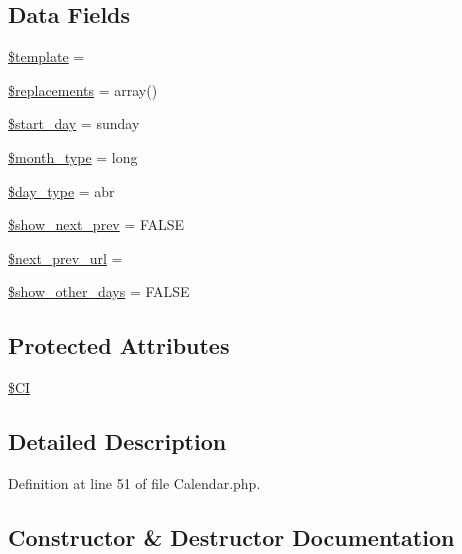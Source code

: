 \subsection*{Data Fields}
\begin{DoxyCompactItemize}
\item 
\mbox{\hyperlink{class_c_i___calendar_aa3e9534005fd516d941f6a5569896e01}{\$template}} = \textquotesingle{}\textquotesingle{}
\item 
\mbox{\hyperlink{class_c_i___calendar_a93cb3f67ace379a71de4fb00bcc7a605}{\$replacements}} = array()
\item 
\mbox{\hyperlink{class_c_i___calendar_ac4e461505bb7cd9a2fdb2bf47560a389}{\$start\+\_\+day}} = \textquotesingle{}sunday\textquotesingle{}
\item 
\mbox{\hyperlink{class_c_i___calendar_ab40961ce0a0e4a7ee10ad389c9566b28}{\$month\+\_\+type}} = \textquotesingle{}long\textquotesingle{}
\item 
\mbox{\hyperlink{class_c_i___calendar_a1e35fdb6b6cc297a6bb256517a8d813d}{\$day\+\_\+type}} = \textquotesingle{}abr\textquotesingle{}
\item 
\mbox{\hyperlink{class_c_i___calendar_aeade2ffe515604c0dffb78d32ca846ae}{\$show\+\_\+next\+\_\+prev}} = F\+A\+L\+SE
\item 
\mbox{\hyperlink{class_c_i___calendar_a3ed0df912e3e67eb17d432c1f54ae2de}{\$next\+\_\+prev\+\_\+url}} = \textquotesingle{}\textquotesingle{}
\item 
\mbox{\hyperlink{class_c_i___calendar_a52c552ab98b51789690522ff7d41ecb7}{\$show\+\_\+other\+\_\+days}} = F\+A\+L\+SE
\end{DoxyCompactItemize}
\subsection*{Protected Attributes}
\begin{DoxyCompactItemize}
\item 
\mbox{\hyperlink{class_c_i___calendar_ae0314d046ddf7fcfaec03222977427d3}{\$\+CI}}
\end{DoxyCompactItemize}


\subsection{Detailed Description}


Definition at line 51 of file Calendar.\+php.



\subsection{Constructor \& Destructor Documentation}
\mbox{\label{class_c_i___calendar_af7f9493844d2d66e924e3c1df51ce616}} 
